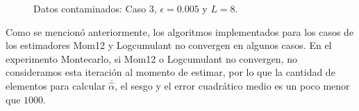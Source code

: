 \begin{figure}[h!]
	\caption{\label{Caso3L8}\small Datos contaminados: Caso $3$, $\epsilon=0.005$ y $ L=8$.}
\end{figure}

Como se mencionó anteriormente, los algoritmos implementados para los casos de los estimadores Mom12 y Logcumulant no convergen en algunos casos. En el experimento Montecarlo, si Mom12 o  Logcumulant no convergen, no consideramos esta iteración al momento de estimar, por lo que la cantidad de elementos para calcular $\overline{\widehat{\alpha}}$, el sesgo y el error cuadrático medio es un poco menor que $1000$.

